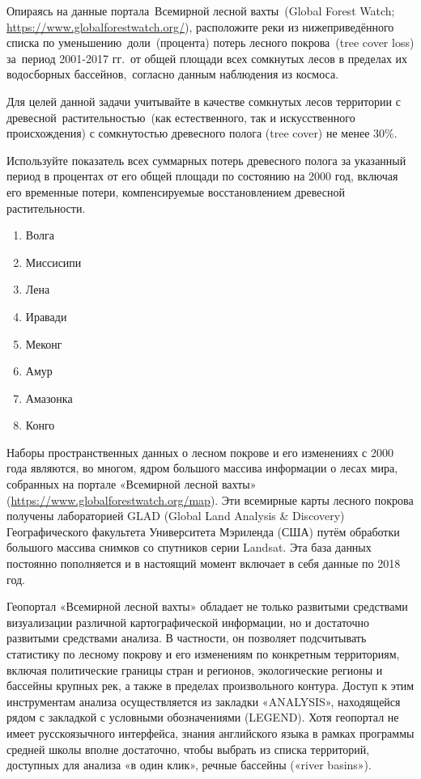 
Опираясь на данные портала Всемирной лесной вахты (Global Forest Watch; \url{https://www.globalforestwatch.org/}), расположите реки из нижеприведённого списка по уменьшению доли (процента) потерь лесного покрова (tree cover loss) за период 2001-2017 гг. от общей площади всех сомкнутых лесов в пределах их водосборных бассейнов, согласно данным наблюдения из космоса.

Для целей данной задачи учитывайте в качестве сомкнутых лесов территории с древесной растительностью (как естественного, так и искусственного происхождения) с сомкнутостью древесного полога (tree cover) не менее 30\%.

Используйте показатель всех суммарных потерь древесного полога за указанный период в процентах от его общей площади по состоянию на 2000 год, включая его временные потери, компенсируемые восстановлением древесной растительности.

\begin{enumerate}
    \item Волга
    \item Миссисипи
    \item Лена
    \item Иравади
    \item Меконг
    \item Амур
    \item Амазонка
    \item Конго
\end{enumerate}

\explanationSection

Наборы пространственных данных о лесном покрове и его изменениях с 2000 года являются, во многом, ядром большого массива информации о лесах мира, собранных на портале «Всемирной лесной вахты» (\url{https://www.globalforestwatch.org/map}). Эти всемирные карты лесного покрова получены лабораторией GLAD (Global Land Analysis \& Discovery) Географического факультета Университета Мэриленда (США) путём обработки большого массива снимков со спутников серии Landsat. Эта база данных постоянно пополняется и в настоящий момент включает в себя данные по 2018 год.

Геопортал «Всемирной лесной вахты» обладает не только развитыми средствами визуализации различной картографической информации, но и достаточно развитыми средствами анализа. В частности, он позволяет подсчитывать статистику по лесному покрову и его изменениям по конкретным территориям, включая политические границы стран и регионов, экологические регионы и бассейны крупных рек, а также в пределах произвольного контура. Доступ к этим инструментам анализа осуществляется из закладки «ANALYSIS», находящейся рядом с закладкой с условными обозначениями (LEGEND). Хотя геопортал не имеет русскоязычного интерфейса, знания английского языка в рамках программы средней школы вполне достаточно, чтобы выбрать из списка территорий, доступных для анализа «в один клик», речные бассейны («river basins»).

